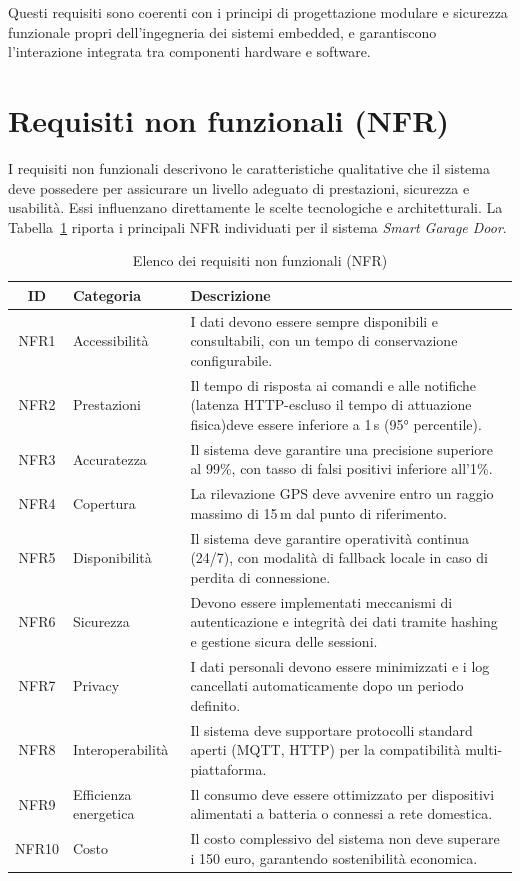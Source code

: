 Questi requisiti sono coerenti con i principi di progettazione modulare e sicurezza funzionale propri dell’ingegneria dei sistemi embedded, e garantiscono l’interazione integrata tra componenti hardware e software.

\section{Requisiti non funzionali (NFR)}
I requisiti non funzionali descrivono le caratteristiche qualitative che il sistema deve possedere per assicurare un livello adeguato di prestazioni, sicurezza e usabilità.  
Essi influenzano direttamente le scelte tecnologiche e architetturali.  
La Tabella~\ref{tab:nfr} riporta i principali NFR individuati per il sistema \textit{Smart Garage Door}.

\begin{table}[h!]
\centering
\caption{Elenco dei requisiti non funzionali (NFR)}
\label{tab:nfr}
\begin{tabularx}{\textwidth}{@{}clX@{}}
\toprule
\textbf{ID} & \textbf{Categoria} & \textbf{Descrizione} \\
\midrule
NFR1 & Accessibilità & I dati devono essere sempre disponibili e consultabili, con un tempo di conservazione configurabile. \\
NFR2 & Prestazioni & Il tempo di risposta ai comandi e alle notifiche (latenza HTTP-escluso il tempo di attuazione fisica)deve essere inferiore a 1\,s (95° percentile). \\
NFR3 & Accuratezza & Il sistema deve garantire una precisione superiore al 99\%, con tasso di falsi positivi inferiore all’1\%. \\
NFR4 & Copertura & La rilevazione GPS deve avvenire entro un raggio massimo di 15\,m dal punto di riferimento. \\
NFR5 & Disponibilità & Il sistema deve garantire operatività continua (24/7), con modalità di fallback locale in caso di perdita di connessione. \\
NFR6 & Sicurezza & Devono essere implementati meccanismi di autenticazione e integrità dei dati tramite hashing e gestione sicura delle sessioni. \\
NFR7 & Privacy & I dati personali devono essere minimizzati e i log cancellati automaticamente dopo un periodo definito. \\
NFR8 & Interoperabilità & Il sistema deve supportare protocolli standard aperti (MQTT, HTTP) per la compatibilità multi-piattaforma. \\
NFR9 & Efficienza energetica & Il consumo deve essere ottimizzato per dispositivi alimentati a batteria o connessi a rete domestica. \\
NFR10 & Costo & Il costo complessivo del sistema non deve superare i 150 euro, garantendo sostenibilità economica. \\
\bottomrule
\end{tabularx}
\end{table}

